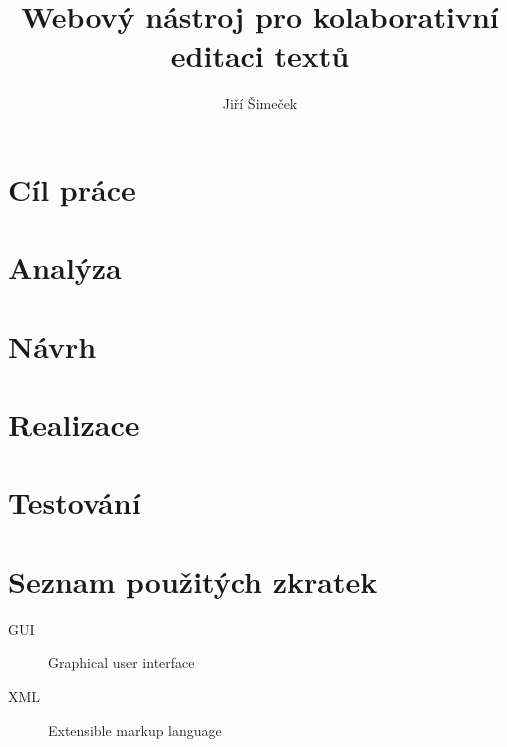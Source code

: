 \documentclass[thesis=B,czech]{./template/FITthesis}[2012/06/26]
\title{Webový nástroj pro kolaborativní editaci textů}
\author{Jiří Šimeček} %
\begin{document}

    \begin{introduction}
        
    \end{introduction}

    \chapter{Cíl práce}
    

    \chapter{Analýza}
    

    \chapter{Návrh}
    

    \chapter{Realizace}
    

    \chapter{Testování}
    

    \begin{conclusion}
        
    \end{conclusion}

    
    

    \appendix

    \chapter{Seznam použitých zkratek}
    \begin{description}
        \item[GUI] Graphical user interface
        \item[XML] Extensible markup language
    \end{description}
\end{document}
